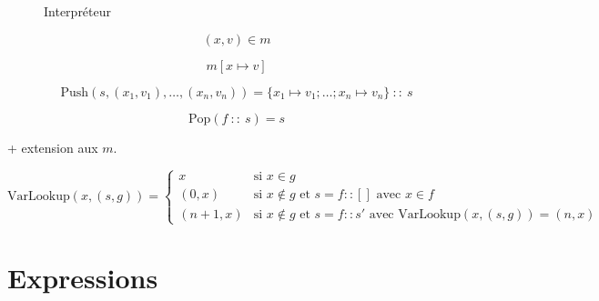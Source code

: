\begin{figure}





  \caption{Interpréteur}
  \label{fig:interp}
\end{figure}

\[
  (x, v) ∈ m
\]

\[
  m[x ↦ v]
\]


\[
  \mathrm{Push}(s, (x_1, v_1), …, (x_n, v_n)) = \{ x_1 ↦ v_1 ; … ; x_n ↦ v_n \}~::~s
\]

\[
  \mathrm{Pop}(f~::~s) = s
\]

+ extension aux $m$.

\[
  \textrm{VarLookup} (x, (s, g)) =
  \left\{
    \begin{array}{ll}
      x      & \mbox{si } x ∈ g \\
    (0, x)   & \mbox{si } x ∉ g \mbox{ et } s = f::[]
               \mbox{ avec } x ∈ f \\
    (n+1, x) & \mbox{si } x ∉ g \mbox{ et } s = f::s'
               \mbox{ avec } \textrm{VarLookup} (x, (s, g)) = (n, x)
    \end{array}
  \right.
\]

\section{Expressions}

